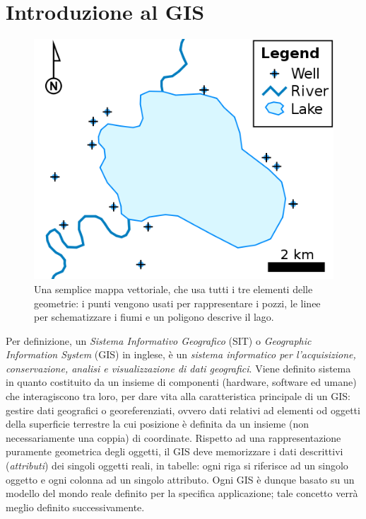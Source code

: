 
\chapter{Introduzione al GIS}

\begin{figure}
	\begin{centering}
		\includegraphics[scale=0.35]{img/500px-Simple_vector_map}
		\par
	\end{centering}
	\caption{{\small\label{fig:Una-semplice-mappa}Una semplice mappa vettoriale, che usa tutti i tre elementi delle geometrie: i punti vengono usati per rappresentare i pozzi, le linee per schematizzare i fiumi e un poligono descrive il lago.}}
	\vspace{-10pt}
\end{figure}

Per definizione, un \emph{Sistema Informativo Geografico} (SIT) o \emph{Geographic Information System} (GIS) in inglese, è un \emph{sistema informatico per l'acquisizione, conservazione, analisi e visualizzazione di dati geografici}. Viene definito sistema in quanto costituito da un insieme di componenti (hardware, software ed umane) che interagiscono tra loro, per dare vita alla caratteristica principale di un GIS: gestire dati geografici o georeferenziati, ovvero dati relativi ad elementi od oggetti della superficie terrestre la cui posizione è definita da un insieme (non necessariamente una coppia) di coordinate. Rispetto ad una rappresentazione puramente geometrica degli oggetti, il GIS deve memorizzare i dati descrittivi (\emph{attributi}) dei singoli oggetti reali, in tabelle: ogni riga si riferisce ad un singolo oggetto e ogni colonna ad un singolo attributo. Ogni GIS è dunque basato su un modello del mondo reale definito per la specifica applicazione; tale concetto verrà meglio definito successivamente.

